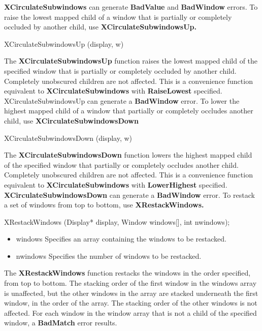 \documentclass{report}
\begin{document}
\begin{itemize}
            \bigbreak \noindent 
            \textbf{XCirculateSubwindows} can generate \textbf{BadValue} and \textbf{BadWindow} errors.
            \bigbreak \noindent 
            To raise the lowest mapped child of a window that is partially or completely occluded by another child, use \textbf{XCirculateSubwindowsUp.}
            \bigbreak \noindent 
            \begin{cppcode}
                XCirculateSubwindowsUp (display, w)
            \end{cppcode}
            The \textbf{XCirculateSubwindowsUp} function raises the lowest mapped child of the specified window that is partially or completely occluded by another child. Completely unobscured children are not affected. This is a convenience function equivalent to \textbf{XCirculateSubwindows} with \textbf{RaiseLowest} specified.
            \bigbreak \noindent 
            XCirculateSubwindowsUp can generate a \textbf{BadWindow} error.
            \bigbreak \noindent 
            To lower the highest mapped child of a window that partially or completely occludes another child, use \textbf{XCirculateSubwindowsDown}
            \bigbreak \noindent 
            \begin{cppcode}
                XCirculateSubwindowsDown (display, w)
            \end{cppcode}
            The \textbf{XCirculateSubwindowsDown} function lowers the highest mapped child of the specified window that partially or completely occludes another child. Completely unobscured children are not affected. This is a convenience function equivalent to \textbf{XCirculateSubwindows} with \textbf{LowerHighest} specified.
            \bigbreak \noindent 
            \textbf{XCirculateSubwindowsDown} can generate a \textbf{BadWindow} error.
            \bigbreak \noindent 
            To restack a set of windows from top to bottom, use \textbf{XRestackWindows.}
            \bigbreak \noindent 
            \begin{cppcode}
                XRestackWindows (Display* display, Window windows[], int nwindows);
            \end{cppcode}
            \begin{itemize}
                \item windows Specifies an array containing the windows to be restacked.
                \item nwindows Specifies the number of windows to be restacked.
            \end{itemize}
            The \textbf{XRestackWindows} function restacks the windows in the order specified, from top to bottom. The stacking order of the first window in the windows array is unaffected, but the other windows in the array are stacked underneath the first window, in the order of the array. The stacking order of the other windows is not affected. For each window in the window array that is not a child of the specified window, a \textbf{BadMatch} error results.

\end{itemize}
\end{document}
